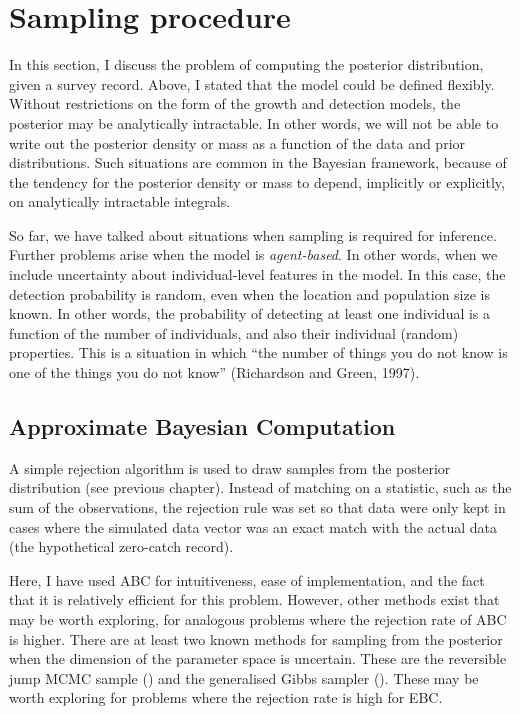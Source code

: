 \documentclass[
  oneside]{book}
\begin{document}
\hypertarget{sampling-procedure}{%
\section{Sampling procedure}\label{sampling-procedure}}

In this section, I discuss the problem of computing the posterior distribution, given a survey record. Above, I stated that the model could be defined flexibly. Without restrictions on the form of the growth and detection models, the posterior may be analytically intractable. In other words, we will not be able to write out the posterior density or mass as a function of the data and prior distributions. Such situations are common in the Bayesian framework, because of the tendency for the posterior density or mass to depend, implicitly or explicitly, on analytically intractable integrals.

So far, we have talked about situations when sampling is required for inference. Further problems arise when the model is \emph{agent-based}. In other words, when we include uncertainty about individual-level features in the model. In this case, the detection probability is random, even when the location and population size is known. In other words, the probability of detecting at least one individual is a function of the number of individuals, and also their individual (random) properties. This is a situation in which ``the number of things you do not know is one of the things you do not know'' (Richardson and Green, 1997).

\hypertarget{approximate-bayesian-computation}{%
\subsection{Approximate Bayesian Computation}\label{approximate-bayesian-computation}}

A simple rejection algorithm is used to draw samples from the posterior distribution (see previous chapter). Instead of matching on a statistic, such as the sum of the observations, the rejection rule was set so that data were only kept in cases where the simulated data vector was an exact match with the actual data (the hypothetical zero-catch record).

Here, I have used ABC for intuitiveness, ease of implementation, and the fact that it is relatively efficient for this problem. However, other methods exist that may be worth exploring, for analogous problems where the rejection rate of ABC is higher. There are at least two known methods for sampling from the posterior when the dimension of the parameter space is uncertain. These are the reversible jump MCMC sample (\citet{green1995}) and the generalised Gibbs sampler (\citet{keith2015}). These may be worth exploring for problems where the rejection rate is high for EBC.
\end{document}
